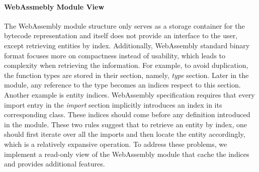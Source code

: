 \paragraph{WebAssmebly Module View}
The WebAssembly module structure only serves as a storage container for the bytecode representation and itself does not provide an interface to the user, except retrieving entities by index. Additionally, WebAssembly standard binary format focuses more on compactness instead of usability, which leads to complexity when retrieving the information. For example, to avoid duplication, the function types are stored in their section, namely, \emph{type} section. Later in the module, any reference to the type becomes an indices respect to this section. Another example is entity indices. WebAssembly specification requires that every import entry in the \emph{import} section implicitly introduces an index in its corresponding class. These indices should come before any definition introduced in the module. These two rules suggest that to retrieve an entity by index, one should first iterate over all the imports and then locate the entity accordingly, which is a relatively expansive operation. To address these problems, we implement a read-only view of the WebAssembly module that cache the indices and provides additional features. 

